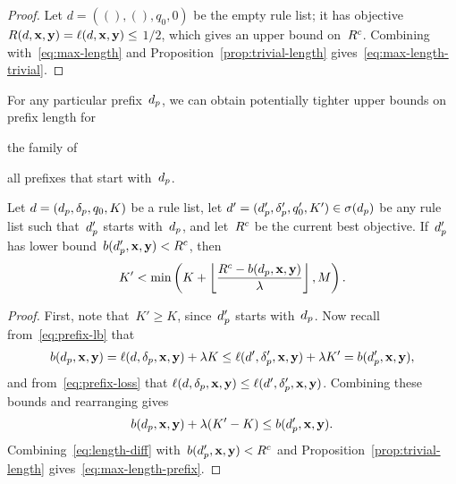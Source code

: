 \begin{arxiv}
\begin{proof}
Let ${d = ((), (), q_0, 0)}$ be the empty rule list;
it has objective ${R({d}, \mathbf{x}, \mathbf{y}) = \ell({d}, \mathbf{x}, \mathbf{y}) \le}$ ${1/2}$,
which gives an upper bound on~${R^c}$.
%
Combining with~\eqref{eq:max-length}
and Proposition~\ref{prop:trivial-length}
gives~\eqref{eq:max-length-trivial}.
\end{proof}
\end{arxiv}

For any particular prefix~$d_p$, we can obtain potentially tighter
upper bounds on prefix length for
\begin{arxiv}
the family of
\end{arxiv}
all prefixes that start with~$d_p$.


\begin{theorem}
\label{thm:ub-prefix-specific}
Let ${{d} = (d_p, \delta_p, q_0, K)}$ be a rule list, let
${{d}' = (d_p', \delta_p', q_0', K') \in \sigma(d_p)}$
be any rule list such that~$d_p'$ starts with~$d_p$,
and let~${R^c}$ be the current best objective.
%
If~$d_p'$ has lower bound~${b(d_p', \mathbf{x}, \mathbf{y}) < {R^c}}$, then
\begin{align}
K' < \min \left( K + \left\lfloor \frac{{R^c} - b(d_p, \mathbf{x}, \mathbf{y})}{{\lambda}} \right\rfloor, M \right).
\label{eq:max-length-prefix}
\end{align}
\end{theorem}

\begin{arxiv}
\begin{proof}
First, note that~${K' \ge K}$, since~$d_p'$ starts with~$d_p$.
%
Now recall from~\eqref{eq:prefix-lb} that
%
\begin{align}
b(d_p, \mathbf{x}, \mathbf{y}) = \ell({d}, \delta_p, \mathbf{x}, \mathbf{y}) + {\lambda} K
\le \ell({d}', \delta_p', \mathbf{x}, \mathbf{y}) + {\lambda} K' = b(d_p', \mathbf{x}, \mathbf{y}),
\end{align}
%
and from~\eqref{eq:prefix-loss} that
${\ell({d}, \delta_p, \mathbf{x}, \mathbf{y}) \le \ell({d}', \delta_p', \mathbf{x}, \mathbf{y})}$.
%
Combining these bounds and rearranging gives
\begin{align}
b(d_p, \mathbf{x}, \mathbf{y}) + {\lambda} (K' - K) \le b(d_p', \mathbf{x}, \mathbf{y}).
\label{eq:length-diff}
\end{align}
Combining~\eqref{eq:length-diff} with~${b(d_p', \mathbf{x}, \mathbf{y}) < {R^c}}$
and Proposition~\ref{prop:trivial-length} gives~\eqref{eq:max-length-prefix}.
\end{proof}
\end{arxiv}

